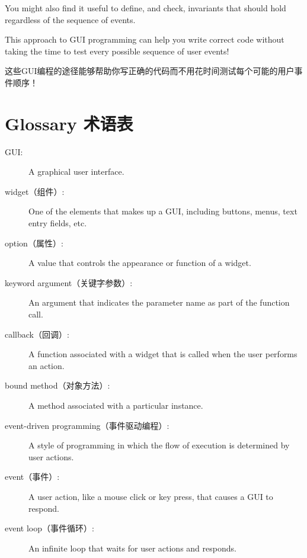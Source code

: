 \documentclass[10pt]{book}
\begin{document}
\begin{CJK}{UTF8}{gbsn}
\begin{itemize}
\end{itemize}

You might also find it useful to define, and check, invariants that
should hold regardless of the sequence of events.


This approach to GUI programming can help you write correct
code without taking the time to test every possible sequence
of user events!

这些GUI编程的途径能够帮助你写正确的代码而不用花时间测试每个可能的用户事件顺序！


\section{Glossary 术语表}

\begin{description}

\item[GUI:] A graphical user interface.

\item[widget（组件）:] One of the elements that makes up a GUI, including
buttons, menus, text entry fields, etc. 

\item[option（属性）:] A value that controls the appearance or function of
a widget.

\item[keyword argument（关键字参数）:] An argument that indicates the parameter
name as part of the function call.

\item[callback（回调）:] A function associated with a widget that is
called when the user performs an action.

\item[bound method（对象方法）:] A method associated with a particular instance.

\item[event-driven programming（事件驱动编程）:] A style of programming in which
the flow of execution is determined by user actions.

\item[event（事件）:] A user action, like a mouse click or key press, that
causes a GUI to respond.

\item[event loop（事件循环）:] An infinite loop that waits for user actions
and responds.


\end{description}
\end{CJK}
\end{document}
